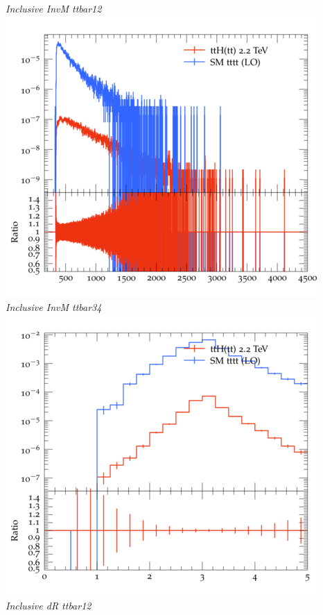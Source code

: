 \documentclass{beamer}
\begin{document}
\begin{frame}
\begin{columns}
\textit{\small Inclusive InvM ttbar12}
\includegraphics[width=\textwidth]{../plots/ttH_2200/tttt_ttH/Inclusive_InvM_ttbar34.png}\\
\textit{\small Inclusive InvM ttbar34}
\includegraphics[width=\textwidth]{../plots/ttH_2200/tttt_ttH/Inclusive_dR_ttbar12.png}\\
\textit{\small Inclusive dR ttbar12}
\end{columns}
\end{frame}
\end{document}
